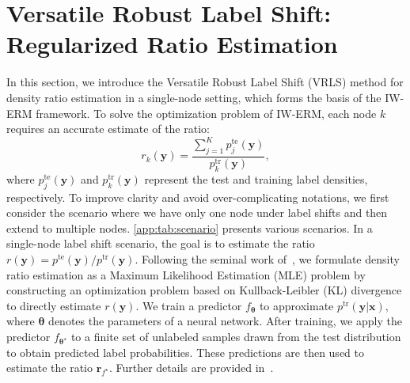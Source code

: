 \section{ Versatile Robust Label Shift: Regularized Ratio Estimation}\label{sec:ratio}

In this section, we introduce the Versatile Robust Label Shift (VRLS) method for density ratio estimation in a single-node setting, which forms the basis of the IW-ERM framework. 
To solve the optimization problem of IW-ERM, each node \( k \) requires an accurate estimate of the ratio:
\begin{equation}
r_k(\boldsymbol{y}) = \frac{\sum_{j=1}^K p_j^{\text{te}}(\boldsymbol{y})}{p_k^{\text{tr}}(\boldsymbol{y})},    
\label{eq:densityratio}
\end{equation}
where \( p_j^{\text{te}}(\boldsymbol{y}) \) and \( p_k^{\text{tr}}(\boldsymbol{y}) \) represent the test and training label densities, respectively.
To improve clarity and avoid over-complicating notations, we first consider the scenario where we have only one node under label shifts and then extend to multiple nodes.
\cref{app:tab:scenario} presents various scenarios.
In a single-node label shift scenario, the goal is to estimate the ratio \( r(\boldsymbol{y}) = p^{\text{te}}(\boldsymbol{y}) / p^{\text{tr}}(\boldsymbol{y}) \). 
Following the seminal work of~\citet{mlls}, we formulate density ratio estimation as a Maximum Likelihood Estimation (MLE) problem by constructing an optimization problem based on Kullback-Leibler (KL) divergence to directly estimate \( r(\boldsymbol{y}) \). 
We train a predictor \( f_{\boldsymbol{\theta}} \) to approximate \( p^{\text{tr}}(\boldsymbol{y} | \boldsymbol{x}) \), where \( \boldsymbol{\theta} \) denotes the parameters of a neural network.
After training, we apply the predictor  $f_{\boldsymbol{\theta}^\star}$ to a finite set of unlabeled samples drawn from the test distribution to obtain predicted label probabilities. These predictions are then used to estimate the ratio $\boldsymbol{r}_{f^\star}$.
Further details are provided in~.


